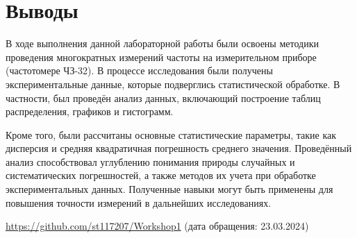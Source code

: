 \section{Выводы}
В ходе выполнения данной лабораторной работы были освоены методики проведения многократных измерений частоты на измерительном приборе (частотомере ЧЗ-32). В процессе исследования были получены экспериментальные данные, которые подверглись статистической обработке. В частности, был проведён анализ данных, включающий построение таблиц распределения, графиков и гистограмм.

Кроме того, были рассчитаны основные статистические параметры, такие как дисперсия и средняя квадратичная погрешность среднего значения. Проведённый анализ способствовал углублению понимания природы случайных и систематических погрешностей, а также методов их учета при обработке экспериментальных данных. Полученные навыки могут быть применены для повышения точности измерений в дальнейших исследованиях.


\begin{thebibliography}{9}

\url{https://github.com/st117207/Workshop1}  (дата обращения: 23.03.2024) 


\end{thebibliography}


